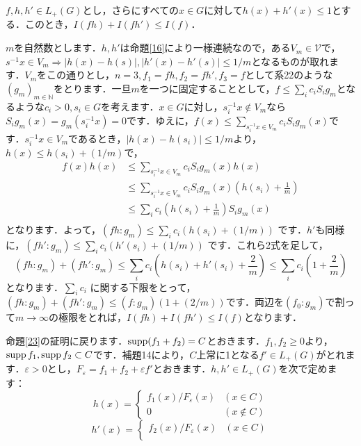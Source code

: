 \begin{Proof}
\begin{ylem}\label{24}
$f, h, h'\in L_{+}(G)$とし，さらにすべての$x \in G$に対して$h(x)+h'(x) \le 1$とする．このとき，$I(fh)+I(fh') \le I(f)$．
\end{ylem}
\begin{Proof}
$m$を自然数とします．$h,h'$は命題\ref{16}により一様連続なので，ある$V_m \in \mathscr{V}$で，$s^{-1}x \in V_{m} \Rightarrow |h(x)-h(s)|, |h'(x)-h'(s)| \le 1/m$となるものが取れます．$V_m$をこの通りとし，$n=3, f_1=fh, f_2=fh', f_3=f$として系22のような$(g_m)_{m \in \mathbb{N}}$をとります．一旦$m$を一つに固定することとして，$f \le \sum_{i}c_i S_{i}g_m$となるような$c_i>0, s_i \in G$を考えます．$x \in G$に対し，$s_{i}^{-1}x \not\in V_m$なら$S_{i}g_{m}(x)=g_{m}(s_{i}^{-1}x)=0$です．ゆえに，$f(x) \le \sum_{s_{i}^{-1}x \in V_m} c_{i}S_{i}g_{m}(x)$です．$s_{i}^{-1}x \in V_m$であるとき，$|h(x)-h(s_i)| \le 1/m$より，$h(x) \le h(s_i)+(1/m)$で，
\begin{align*}
f(x)h(x)  & \le \sum_{s_{i}^{-1}x \in V_m} c_{i}S_{i}g_{m}(x)h(x) \\
& \le \sum_{s_{i}^{-1}x \in V_m} c_{i}S_{i}g_{m}(x) \left( h(s_i)+\frac{1}{m} \right) \\
& \le \sum_{i}c_{i} \left( h(s_i)+\frac{1}{m} \right) S_{i}g_{m}(x) \\
\end{align*}
となります．よって，$( fh \colon g_m ) \le \sum_{i}c_{i} ( h(s_i)+(1/m) )$ です．$h'$も同様に，$( fh' \colon g_m ) \le \sum_{i}c_{i} ( h'(s_i)+(1/m) )$ です．これら2式を足して，
\[
( fh \colon g_m )+( fh' \colon g_m ) \le \sum_{i}c_{i} \left( h(s_i)+h'(s_i)+\frac{2}{m} \right) \le \sum_{i}c_{i} \left( 1+\frac{2}{m} \right)
\]
となります．$\sum_{i}c_{i}$ に関する下限をとって，$( fh \colon g_m )+( fh' \colon g_m ) \le ( f \colon g_m ) ( 1+(2/m) )$です．両辺を$(f_0 \colon g_m)$で割って$m \to \infty$の極限をとれば，$I(fh)+I(fh') \le I(f)$となります．　
\end{Proof}
命題\ref{23}の証明に戻ります．$\operatorname{supp} (f_{1}+f_{2})=C$とおきます．$f_1, f_2 \ge 0$より，$\operatorname{supp} f_1, \operatorname{supp} f_2 \subset C$です．補題14により，$C$上常に1となる$f' \in L_{+}(G)$がとれます．$\varepsilon>0$とし，$F_{\varepsilon}=f_{1}+f_{2}+\varepsilon f'$とおきます．$h,h' \in L_{+}(G)$を次で定めます：
\[
h(x)=
\begin{cases}
f_{1}(x)/F_{\varepsilon}(x) & (x \in C) \\
0 & (x \not\in C)
\end{cases}
\]
\[
h'(x)=
\begin{cases}
f_{2}(x)/F_{\varepsilon}(x) & (x \in C) \\

\end{cases}\]
\end{Proof}
